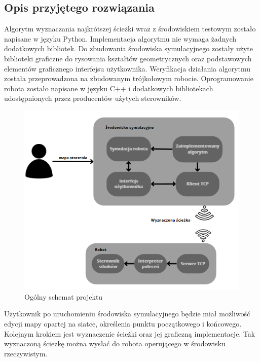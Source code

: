 \subsection{Opis przyjętego rozwiązania}
Algorytm wyznaczania najkrótszej ścieżki wraz z środowiskiem testowym zostało napisane w języku Python.
Implementacja algorytmu nie wymaga żadnych dodatkowych bibliotek. Do zbudowania środowiska symulacyjnego 
zostały użyte biblioteki graficzne do rysowania kształtów geometrycznych oraz podstawowych elementów graficznego 
interfejsu użytkownika. 
Weryfikacja działania algorytmu  została przeprowadzona na zbudowanym trójkołowym robocie.
Oprogramowanie robota zostało napisane w języku C++ i dodatkowych bibliotekach udostępnionych przez producentów użytych sterowników.

\begin{figure}[H]
	\centering
	\includegraphics[width=14cm]{pages/literatura/zdjecia/schematOgolny.png}
	\caption{Ogólny schemat projektu}
	\label{sch:ogolnyRozwiazania}
\end{figure}

Użytkownik po uruchomieniu środowiska symulacyjnego będzie miał możliwość edycji mapy opartej na siatce, określenia punktu początkowego i końcowego.
Kolejnym krokiem jest wyznaczenie ścieżki oraz jej graficzną implementacje. Tak wyznaczoną ścieżkę można wysłać do robota 
operującego w środowisku rzeczywistym. 


